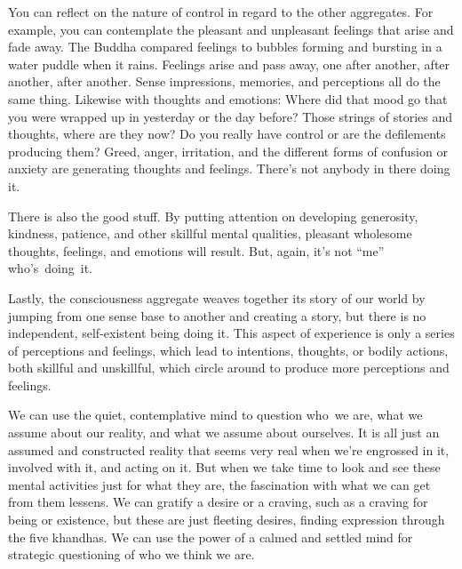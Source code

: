 You can reflect on the nature of control in regard to the other aggregates. For example, you can contemplate the pleasant and unpleasant feelings that arise and fade away. The Buddha compared feelings to bubbles forming and bursting in a water puddle when it rains. Feelings arise and pass away, one after another, after another, after another. Sense impressions, memories, and perceptions all do the same thing. Likewise with thoughts and emotions: Where did that mood go that you were wrapped up in yesterday or the day before? Those strings of stories and thoughts, where are they now? Do you really have control or are the defilements producing them? Greed, anger, irritation, and the different forms of confusion or anxiety are generating thoughts and feelings. There's not anybody in there doing it.

There is also the good stuff. By putting attention on developing generosity, kindness, patience, and other skillful mental qualities, pleasant wholesome thoughts, feelings, and emotions will result. But, again, it's not ``me'' \mbox{who's doing it.}

Lastly, the consciousness aggregate weaves together its story of our world by jumping from one sense base to another and creating a story, but there is no independent, self-existent being doing it. This aspect of experience is only a series of perceptions and feelings, which lead to intentions, thoughts, or bodily actions, both skillful and unskillful, which circle around to produce more perceptions and feelings.

We can use the quiet, contemplative mind to question \mbox{who we} are, what we assume about our reality, and what we assume about ourselves. It is all just an assumed and constructed reality that seems very real when we're engrossed in it, involved with it, and acting on it. But when we take time to look and see these mental activities just for what they are, the fascination with what we can get from them lessens. We can gratify a desire or a craving, such as a craving for being or existence, but these are just fleeting desires, finding expression through the five khandhas. We can use the power of a calmed and settled mind for strategic questioning of who we think we are.

